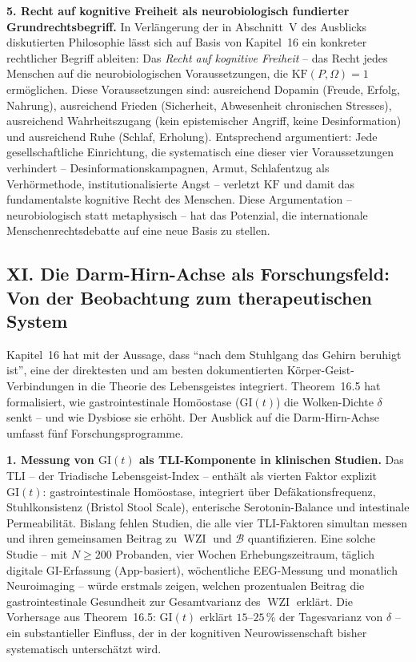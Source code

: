 ﻿\documentclass[12pt,a4paper]{report}
\theoremstyle{plain}
\theoremstyle{definition}
\theoremstyle{remark}
\DeclareMathOperator{\WZI}{WZI}
\begin{document}
	\textbf{5. Recht auf kognitive Freiheit als neurobiologisch
		fundierter Grundrechtsbegriff.}
	In Verlängerung der in Abschnitt~V des Ausblicks diskutierten
	Philosophie lässt sich auf Basis von Kapitel~16 ein
	konkreter rechtlicher Begriff ableiten:
	Das \emph{Recht auf kognitive Freiheit} -- das Recht jedes Menschen
	auf die neurobiologischen Voraussetzungen, die $\mathrm{KF}(P,\Omega) = 1$
	ermöglichen.
	Diese Voraussetzungen sind: ausreichend Dopamin (Freude, Erfolg, Nahrung),
	ausreichend Frieden (Sicherheit, Abwesenheit chronischen Stresses),
	ausreichend Wahrheitszugang (kein epistemischer Angriff, keine
	Desinformation) und ausreichend Ruhe (Schlaf, Erholung).
	Entsprechend argumentiert: Jede gesellschaftliche Einrichtung,
	die systematisch eine dieser vier Voraussetzungen verhindert --
	Desinformationskampagnen, Armut, Schlafentzug als
	Verhörmethode, institutionalisierte Angst -- verletzt
	$\mathrm{KF}$ und damit das fundamentalste kognitive Recht des Menschen.
	Diese Argumentation -- neurobiologisch statt metaphysisch --
	hat das Potenzial, die internationale Menschenrechtsdebatte
	auf eine neue Basis zu stellen.

	\subsection*{XI. Die Darm-Hirn-Achse als Forschungsfeld:
		Von der Beobachtung zum therapeutischen System}

	Kapitel~16 hat mit der Aussage, dass ``nach dem Stuhlgang das
	Gehirn beruhigt ist'', eine der direktesten und am besten
	dokumentierten Körper-Geist-Verbindungen in die Theorie
	des Lebensgeistes integriert. Theorem~16.5 hat formalisiert,
	wie gastrointestinale Homöostase ($\mathrm{GI}(t)$) die
	Wolken-Dichte $\delta$ senkt -- und wie Dysbiose sie erhöht.
	Der Ausblick auf die Darm-Hirn-Achse umfasst fünf Forschungsprogramme.

	\textbf{1. Messung von $\mathrm{GI}(t)$ als TLI-Komponente
		in klinischen Studien.}
	Das TLI -- der Triadische Lebensgeist-Index -- enthält als
	vierten Faktor explizit $\mathrm{GI}(t)$: gastrointestinale
	Homöostase, integriert über Defäkationsfrequenz, Stuhlkonsistenz
	(Bristol Stool Scale), enterische Serotonin-Balance und
	intestinale Permeabilität.
	Bislang fehlen Studien, die alle vier TLI-Faktoren simultan
	messen und ihren gemeinsamen Beitrag zu $\WZI$ und $\mathcal{B}$
	quantifizieren. Eine solche Studie -- mit $N \geq 200$ Probanden,
	vier Wochen Erhebungszeitraum, täglich digitale GI-Erfassung
	(App-basiert), wöchentliche EEG-Messung und monatlich
	Neuroimaging -- würde erstmals zeigen, welchen prozentualen
	Beitrag die gastrointestinale Gesundheit zur Gesamtvarianz
	des $\WZI$ erklärt. Die Vorhersage aus Theorem~16.5:
	$\mathrm{GI}(t)$ erklärt $15$--$25\,\%$ der Tagesvarianz von $\delta$
	-- ein substantieller Einfluss, der in der kognitiven Neurowissenschaft
	bisher systematisch unterschätzt wird.
\end{document}
